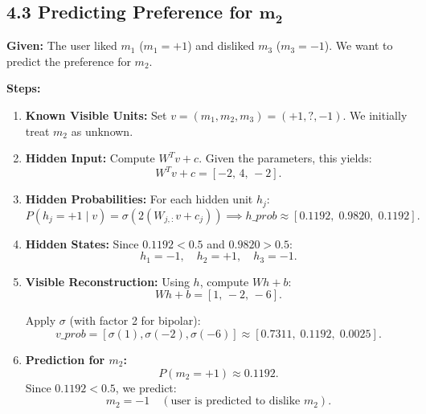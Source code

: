 \documentclass[11pt]{article}
\begin{document}
\subsection*{4.3 Predicting Preference for $\mathbf{m_2}$}
\textbf{Given:} The user liked $m_1$ ($m_1=+1$) and disliked $m_3$ ($m_3=-1$). We want to predict the preference for $m_2$.

\noindent\textbf{Steps:}
\begin{enumerate}
  \item \textbf{Known Visible Units:} Set $v = (m_1, m_2, m_3) = (+1,?, -1)$. We initially treat $m_2$ as unknown.
  
  \item \textbf{Hidden Input:} Compute $W^T v + c$. Given the parameters, this yields:
  \[
  W^T v + c = [-2,\,4,\,-2].
  \]

  \item \textbf{Hidden Probabilities:} For each hidden unit $h_j$:
  \[
  P(h_j=+1 \mid v) = \sigma(2(W_{j,:}v + c_j)) \implies h\_prob \approx [0.1192,\;0.9820,\;0.1192].
  \]

  \item \textbf{Hidden States:} Since $0.1192 < 0.5$ and $0.9820 > 0.5$:
  \[
  h_1 = -1, \quad h_2 = +1, \quad h_3 = -1.
  \]

  \item \textbf{Visible Reconstruction:} Using $h$, compute $W h + b$:
  \[
  W h + b = [1,\, -2,\, -6].
  \]
  
  Apply $\sigma$ (with factor 2 for bipolar):
  \[
  v\_prob = [\sigma(1), \sigma(-2), \sigma(-6)] \approx [0.7311,\;0.1192,\;0.0025].
  \]

  \item \textbf{Prediction for $m_2$:}
  \[
  P(m_2=+1) \approx 0.1192.
  \]
  Since $0.1192 < 0.5$, we predict:
  \[
  m_2 = -1 \quad (\text{user is predicted to dislike } m_2).
  \]
\end{enumerate}
\end{document}
